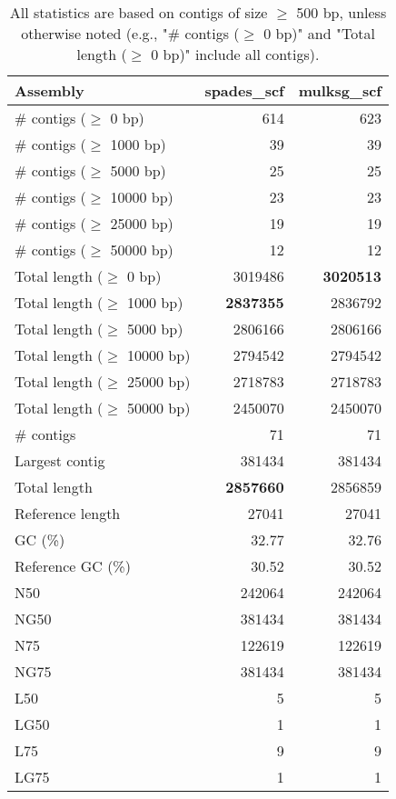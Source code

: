 \documentclass[12pt,a4paper]{article}
\begin{document}
\begin{table}[ht]
\begin{center}
\caption{All statistics are based on contigs of size $\geq$ 500 bp, unless otherwise noted (e.g., "\# contigs ($\geq$ 0 bp)" and "Total length ($\geq$ 0 bp)" include all contigs).}
\begin{tabular}{|l*{2}{|r}|}
\hline
Assembly & spades\_scf & mulksg\_scf \\ \hline
\# contigs ($\geq$ 0 bp) & 614 & 623 \\ \hline
\# contigs ($\geq$ 1000 bp) & 39 & 39 \\ \hline
\# contigs ($\geq$ 5000 bp) & 25 & 25 \\ \hline
\# contigs ($\geq$ 10000 bp) & 23 & 23 \\ \hline
\# contigs ($\geq$ 25000 bp) & 19 & 19 \\ \hline
\# contigs ($\geq$ 50000 bp) & 12 & 12 \\ \hline
Total length ($\geq$ 0 bp) & 3019486 & {\bf 3020513} \\ \hline
Total length ($\geq$ 1000 bp) & {\bf 2837355} & 2836792 \\ \hline
Total length ($\geq$ 5000 bp) & 2806166 & 2806166 \\ \hline
Total length ($\geq$ 10000 bp) & 2794542 & 2794542 \\ \hline
Total length ($\geq$ 25000 bp) & 2718783 & 2718783 \\ \hline
Total length ($\geq$ 50000 bp) & 2450070 & 2450070 \\ \hline
\# contigs & 71 & 71 \\ \hline
Largest contig & 381434 & 381434 \\ \hline
Total length & {\bf 2857660} & 2856859 \\ \hline
Reference length & 27041 & 27041 \\ \hline
GC (\%) & 32.77 & 32.76 \\ \hline
Reference GC (\%) & 30.52 & 30.52 \\ \hline
N50 & 242064 & 242064 \\ \hline
NG50 & 381434 & 381434 \\ \hline
N75 & 122619 & 122619 \\ \hline
NG75 & 381434 & 381434 \\ \hline
L50 & 5 & 5 \\ \hline
LG50 & 1 & 1 \\ \hline
L75 & 9 & 9 \\ \hline
LG75 & 1 & 1 \\ \hline

\end{tabular}
\end{center}
\end{table}
\end{document}
